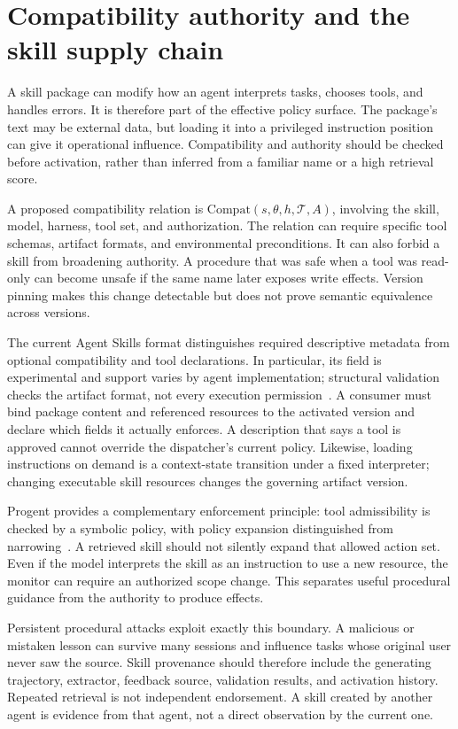\section{Compatibility authority and the skill supply chain}\label{sec:C15:compatibility}
A skill package can modify how an agent interprets tasks, chooses tools, and handles errors. It is therefore part of the effective policy surface. The package's text may be external data, but loading it into a privileged instruction position can give it operational influence. Compatibility and authority should be checked before activation, rather than inferred from a familiar name or a high retrieval score.

A proposed compatibility relation is $\mathrm{Compat}(s,\theta,h,\mathcal T,A)$, involving the skill, model, harness, tool set, and authorization. The relation can require specific tool schemas, artifact formats, and environmental preconditions. It can also forbid a skill from broadening authority. A procedure that was safe when a tool was read-only can become unsafe if the same name later exposes write effects. Version pinning makes this change detectable but does not prove semantic equivalence across versions.

The current Agent Skills format distinguishes required descriptive metadata from optional compatibility and tool declarations. In particular, its  field is experimental and support varies by agent implementation; structural validation checks the artifact format, not every execution permission~\cite{agentskills2026spec}. A consumer must bind package content and referenced resources to the activated version and declare which fields it actually enforces. A description that says a tool is approved cannot override the dispatcher's current policy. Likewise, loading instructions on demand is a context-state transition under a fixed interpreter; changing executable skill resources changes the governing artifact version.

Progent provides a complementary enforcement principle: tool admissibility is checked by a symbolic policy, with policy expansion distinguished from narrowing~\cite{corpus250411703}. A retrieved skill should not silently expand that allowed action set. Even if the model interprets the skill as an instruction to use a new resource, the monitor can require an authorized scope change. This separates useful procedural guidance from the authority to produce effects.

Persistent procedural attacks exploit exactly this boundary. A malicious or mistaken lesson can survive many sessions and influence tasks whose original user never saw the source. Skill provenance should therefore include the generating trajectory, extractor, feedback source, validation results, and activation history. Repeated retrieval is not independent endorsement. A skill created by another agent is evidence from that agent, not a direct observation by the current one.

